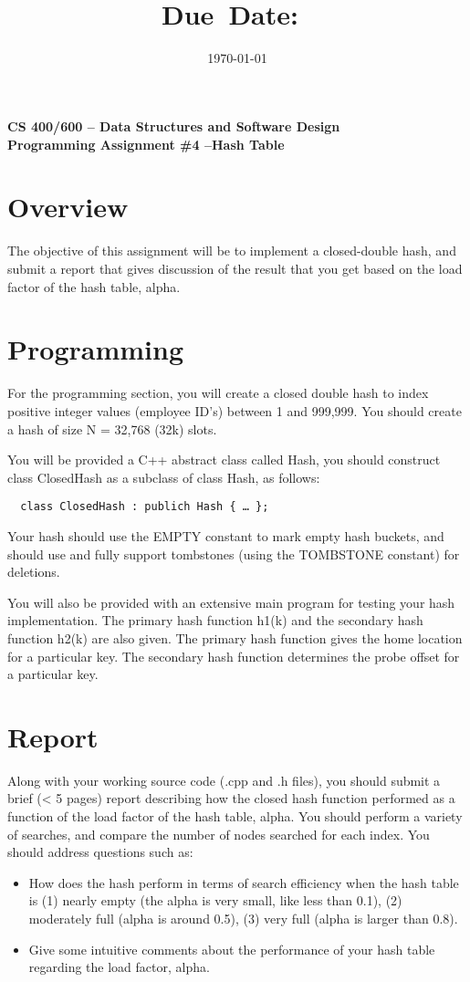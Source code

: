 \documentclass{article}
\title{\textmd{\textbf{\hmwkClass\\\
      \hmwkTitle}}\\\normalsize\small{Due\ Date:\
    \hmwkDueDate}\\}
\date{\today}
\author{\textsc{\hmwkAuthorName}}
\begin{document}
\begin{center}
\textbf{{\Large CS 400/600 – Data Structures and Software Design} \\
{\large Programming Assignment \#4 –Hash Table}}
\end{center}

\section*{Overview}
The objective of this assignment will be to implement a closed-double
hash, and submit a report that gives  discussion of the result that
you get based on the load factor of the hash table, alpha.  

\section*{Programming}
For the programming section, you will create a closed double hash to
index positive integer values (employee ID’s) between 1 and 999,999.
You should create a hash of size N = 32,768 (32k) slots. 

You will be provided a C++ abstract class called Hash, you should
construct class ClosedHash as a subclass of class Hash, as follows:

\begin{verbatim}
  class ClosedHash : publich Hash { … }; 
\end{verbatim}

Your hash should use the EMPTY constant to mark empty hash buckets,
and should use and fully support tombstones (using the TOMBSTONE
constant) for deletions. 

You will also be provided with an extensive main program for testing
your hash implementation. The primary hash function h1(k) and the
secondary hash function h2(k) are also given. The primary hash
function gives the home location for a particular key. The secondary
hash function determines the probe offset for a particular key. 

\section*{Report}
Along with your working source code (.cpp and .h files), you should
submit a brief (< 5 pages) report describing how the closed hash
function performed as a function of the load factor of the hash table,
alpha. You should perform a variety of searches, and compare the
number of nodes searched for each index.  You should address questions
such as: 
\begin{itemize}
\item How does the hash perform in terms of search efficiency when the hash
  table is (1) nearly empty (the alpha is very small, like less than
  0.1),  (2) moderately full (alpha is around 0.5),  (3) very full
  (alpha is larger than 0.8). 
\item Give some intuitive comments about the performance of your hash table
  regarding the load factor, alpha.  
\end{itemize}
\end{document}
